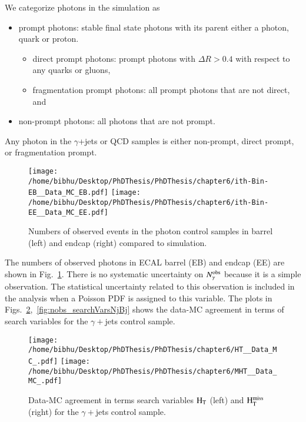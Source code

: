 We categorize photons in the simulation as 
\begin{itemize}
\item prompt photons: stable final state photons with its parent either a photon, quark or proton. 
  \begin{itemize}
  \item direct prompt photons: prompt photons with $\Delta R >0.4$ with respect to any quarks or gluons, 
  \item fragmentation prompt photons: all prompt photons that are not direct, and
  \end{itemize}
\item non-prompt photons: all photons that are not prompt.
\end{itemize} 
Any photon in the $\gamma$+jets or QCD samples is either non-prompt, direct prompt, or fragmentation prompt.  
\begin{figure}[h]
\begin{center}
\texttt{[image: /home/bibhu/Desktop/PhDThesis/PhDThesis/chapter6/ith-Bin-EB\_\_Data\_MC\_EB.pdf]} %
\texttt{[image: /home/bibhu/Desktop/PhDThesis/PhDThesis/chapter6/ith-Bin-EE\_\_Data\_MC\_EE.pdf]} %
\caption{Numbers of observed events in the photon control samples in barrel (left) and endcap (right) compared to simulation.}
\label{fig:nobs}
\end{center}
\end{figure}

The numbers of observed photons in ECAL barrel (EB) and endcap (EE) are shown in Fig.~\ref{fig:nobs}.
There is no systematic uncertainty on $N_{\gamma}^{\rm obs}$ because it is a simple observation.  The 
statistical uncertainty related to this observation is included in the analysis when a 
Poisson PDF is assigned to this variable. The plots in Figs.~\ref{fig:nobs_searchVarsHTMHT},~\ref{fig:nobs_searchVarsNjBj} shows the  data-MC agreement in  terms of search variables  for the $\gamma+$jets  control sample.

\begin{figure}[h]
\begin{center}
\texttt{[image: /home/bibhu/Desktop/PhDThesis/PhDThesis/chapter6/HT\_\_Data\_MC\_.pdf]} %
\texttt{[image: /home/bibhu/Desktop/PhDThesis/PhDThesis/chapter6/MHT\_\_Data\_MC\_.pdf]} %
\caption{Data-MC agreement in terms search variables $\rm H_{T}$ (left) and $\rm H_{T}^{miss}$ (right) for the $\gamma+$jets control sample.}
\label{fig:nobs_searchVarsHTMHT}
\end{center}
\end{figure}


